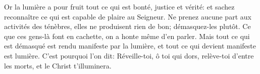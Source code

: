 Or la lumière a pour fruit tout ce qui est bonté, justice et vérité:
	et sachez reconnaître ce qui est capable de plaire au Seigneur.
Ne prenez aucune part aux activités des ténèbres, elles ne produisent rien de bon;
	démasquez-les plutôt.
Ce que ces gens-là font en cachette, on a honte même d’en parler.
Mais tout ce qui est démasqué est rendu manifeste par la lumière,
	et tout ce qui devient manifeste est lumière.
C’est pourquoi l’on dit: Réveille-toi, ô toi qui dors, relève-toi d’entre les morts,
	et le Christ t’illuminera.
